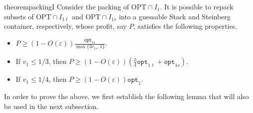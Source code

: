 \documentclass[10pt,a4paper]{amsart}
\newcommand{\akr}[1]{}
\renewcommand{\epsilon}{\varepsilon} %
\theoremstyle{definition}
\newcommand{\opt}{\mathtt{opt}}
\newcommand{\optonel}{\mathtt{opt}_{1\ell}}
\newcommand{\optones}{\mathtt{opt}_{1s}}
\newcommand{\vones}{v_{1s}}
\begin{document}
\begin{restatable}{theorem}{packingI}
\label{thm:packingI1}
    Consider the packing of $\text{OPT}\cap I_1$. It is possible to repack subsets of $\text{OPT}\cap I_{1\ell}$ and $\text{OPT}\cap I_{1s}$ into a guessable Stack and Steinberg container, respectively, whose profit, say $P$, satisfies the following properties.
    \begin{itemize}
        \item $\displaystyle P \ge (1-O(\epsilon))\frac{\opt_{1s}}{\max\{3\vones, 1\}}$.
        \item If $v_1\le 1/3$, then $\displaystyle P  \ge (1-O(\epsilon))\left(\frac{3}{4}\optonel+\optones\right)$.
        \item If $v_1 \le 1/4$, then $P\ge (1-O(\epsilon))\opt_1$.
    \end{itemize}
    
\end{restatable}

In order to prove the above, we first establish the following lemma that will also be used in the next subsection.
\end{document}
